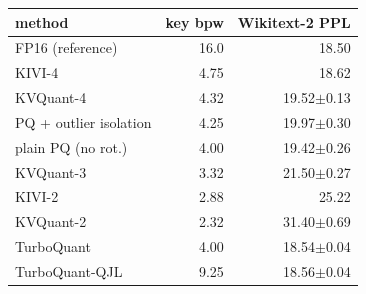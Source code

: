 \begin{tabular}{l r r}
\toprule
method & key bpw & Wikitext-2 PPL \\
\midrule
FP16 (reference) & 16.0 & 18.50 \\
\midrule
KIVI-4 & 4.75 & 18.62 \\
KVQuant-4 & 4.32 & 19.52$\pm$0.13 \\
PQ + outlier isolation & 4.25 & 19.97$\pm$0.30 \\
plain PQ (no rot.) & 4.00 & 19.42$\pm$0.26 \\
KVQuant-3 & 3.32 & 21.50$\pm$0.27 \\
KIVI-2 & 2.88 & 25.22 \\
KVQuant-2 & 2.32 & 31.40$\pm$0.69 \\
TurboQuant & 4.00 & 18.54$\pm$0.04 \\
TurboQuant-QJL & 9.25 & 18.56$\pm$0.04 \\
\bottomrule
\end{tabular}
